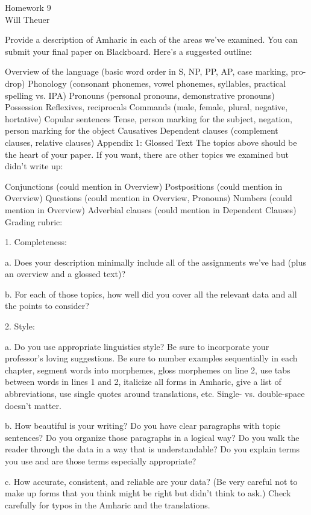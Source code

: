 \documentclass[12pt]{article}
\begin{document}
\begin{center}
{\Large Homework 9} \\
{\large Will Theuer}
\end{center}

\iffalse
Provide a description of Amharic in each of the areas we've examined. You can submit your final paper on Blackboard. Here's a suggested outline:

Overview of the language (basic word order in S, NP, PP, AP, case marking, pro-drop)
Phonology (consonant phonemes, vowel phonemes, syllables, practical spelling vs. IPA)
Pronouns (personal pronouns, demonstrative pronouns)
Possession
Reflexives, reciprocals
Commands (male, female, plural, negative, hortative)
Copular sentences
Tense, person marking for the subject, negation, person marking for the object
Causatives
Dependent clauses (complement clauses, relative clauses)
Appendix 1: Glossed Text
The topics above should be the heart of your paper. If you want, there are other topics we examined but didn't write up:

Conjunctions (could mention in Overview)
Postpositions  (could mention in Overview)
Questions  (could mention in Overview, Pronouns)
Numbers  (could mention in Overview)
Adverbial clauses (could mention in Dependent Clauses)
Grading rubric:

1. Completeness:

a. Does your description minimally include all of the assignments we've had (plus an overview and a glossed text)?

b. For each of those topics, how well did you cover all the relevant data and all the points to consider?

2. Style:

a. Do you use appropriate linguistics style? Be sure to incorporate your professor's loving suggestions. Be sure to number examples sequentially in each chapter, segment words into morphemes, gloss morphemes on line 2, use tabs between words in lines 1 and 2, italicize all forms in Amharic, give a list of abbreviations, use single quotes around translations, etc. Single- vs. double-space doesn't matter.

b. How beautiful is your writing? Do you have clear paragraphs with topic sentences? Do you organize those paragraphs in a logical way? Do you walk the reader through the data in a way that is understandable? Do you explain terms you use and are those terms especially appropriate?

c. How accurate, consistent, and reliable are your data? (Be very careful not to make up forms that you think might be right but didn't think to ask.) Check carefully for typos in the Amharic and the translations.
\end{document}

